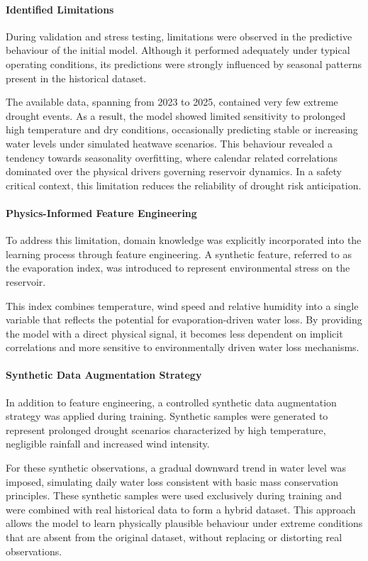 \paragraph{Identified Limitations}
During validation and stress testing, limitations were observed in the predictive behaviour of the initial model. Although it performed adequately under typical operating conditions, its predictions were strongly influenced by seasonal patterns present in the historical dataset.

The available data, spanning from 2023 to 2025, contained very few extreme drought events. As a result, the model showed limited sensitivity to prolonged high temperature and dry conditions, occasionally predicting stable or increasing water levels under simulated heatwave scenarios. This behaviour revealed a tendency towards seasonality overfitting, where calendar related correlations dominated over the physical drivers governing reservoir dynamics. In a safety critical context, this limitation reduces the reliability of drought risk anticipation.

\paragraph{Physics-Informed Feature Engineering}
To address this limitation, domain knowledge was explicitly incorporated into the learning process through feature engineering. A synthetic feature, referred to as the evaporation index, was introduced to represent environmental stress on the reservoir.

This index combines temperature, wind speed and relative humidity into a single variable that reflects the potential for evaporation-driven water loss. By providing the model with a direct physical signal, it becomes less dependent on implicit correlations and more sensitive to environmentally driven water loss mechanisms.

\paragraph{Synthetic Data Augmentation Strategy}
In addition to feature engineering, a controlled synthetic data augmentation strategy was applied during training. Synthetic samples were generated to represent prolonged drought scenarios characterized by high temperature, negligible rainfall and increased wind intensity.

For these synthetic observations, a gradual downward trend in water level was imposed, simulating daily water loss consistent with basic mass conservation principles. These synthetic samples were used exclusively during training and were combined with real historical data to form a hybrid dataset. This approach allows the model to learn physically plausible behaviour under extreme conditions that are absent from the original dataset, without replacing or distorting real observations.

